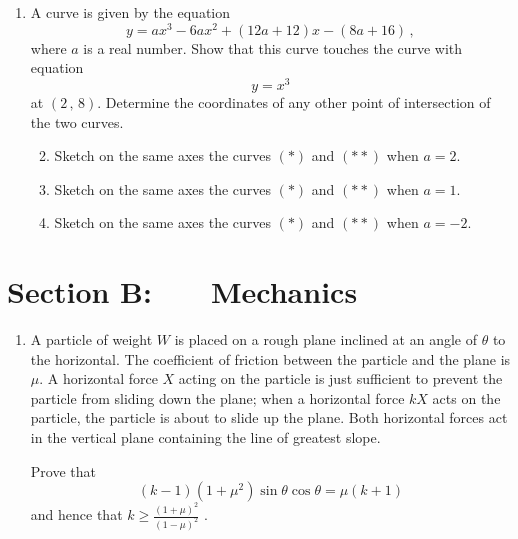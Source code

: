 \documentclass[a4, 11pt]{report}
\newlength{\qspace}
\newcounter{qnumber}
\newenvironment{question}%
 {\vspace{\qspace}
  \begin{enumerate}[\bfseries 1\quad][10]%
    \setcounter{enumi}{\value{qnumber}}%
    \item%
 }
{
  \end{enumerate}
  \filbreak
  \stepcounter{qnumber}
 }
\newenvironment{questionparts}[1][1]%
 {
  \begin{enumerate}[\bfseries (i)]%
    \setcounter{enumii}{#1}
    \addtocounter{enumii}{-1}
    \setlength{\itemsep}{5mm}
    \setlength{\parskip}{8pt}
 }
 {
  \end{enumerate}
 }
\def\ge{\geqslant}
\begin{document}
\begin{question}	
A curve is given by the equation
\[
y = ax^3 - 6ax^2+ \left( 12a + 12 \right)x - \left( 8a + 16 \right)\,,
\tag{$*$}
\]
where $a$ is a real number. Show that this curve touches the curve 
with equation
\[
y=x^3
\tag{$**$}
\]
 at $\left( 2 \, , \, 8 \right)$. 
Determine the coordinates of any other point of
intersection of the two curves.

\begin{questionparts}
\item Sketch on the same axes the curves $(*)$
and $(**)$ when $a = 2$.

\item Sketch on the same axes the curves $(*)$
and $(**)$
when $a = 1$.

\item Sketch on the same axes the curves $(*)$
and $(**)$
when $a = -2$.
\end{questionparts}
\end{question}	
		

		
	
\newpage
\section*{Section B: \ \ \ Mechanics}


	
\begin{question}
A particle of weight $W$ is  placed on a rough plane
inclined at an angle of $\theta$ to the horizontal.
The coefficient of friction between the particle and
the plane is $\mu$. A horizontal force $X$ acting on
the particle is just sufficient to prevent the
particle from sliding down the plane; when a horizontal
force $kX$ acts on the particle, the particle is
about to slide up the plane. Both horizontal forces act in the vertical
plane containing the line of greatest slope.

Prove that
\[
\left( k-1 \right) \left( 1 + \mu^2 \right)
 \sin \theta \cos \theta = \mu \left( k + 1 \right)
\]
and hence that 
$\displaystyle k \ge \frac{ \left( 1+ \mu \right)^2}
{ \left( 1 - \mu \right)^2}$ .
	\end{question}
	
\end{document}
